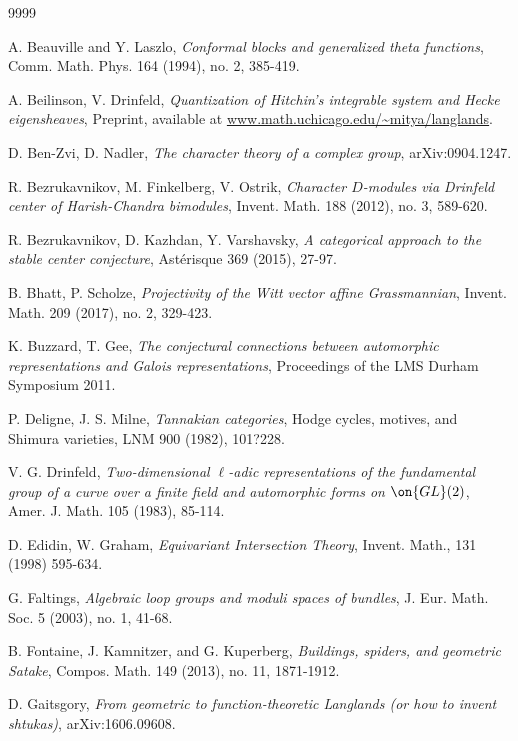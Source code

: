 \documentclass[11pt]{amsart}
\theoremstyle{definition}
\theoremstyle{definition}
\theoremstyle{definition}
\numberwithin{equation}{subsection}
\newcommand{\GL}{{\on{GL}}}
\begin{document}
\begin{thebibliography}{9999}


A. Beauville and Y. Laszlo, {\it Conformal blocks and generalized theta functions}, Comm. Math. Phys. 164 (1994), no. 2, 385-419. 

A. Beilinson, V. Drinfeld, {\it Quantization of Hitchin's integrable system and Hecke
eigensheaves}, Preprint, available at \url{www.math.uchicago.edu/~mitya/langlands}.

D. Ben-Zvi, D. Nadler, {\it The character theory of a complex group}, arXiv:0904.1247.

R. Bezrukavnikov, M. Finkelberg, V. Ostrik, {\it Character $D$-modules via Drinfeld center of Harish-Chandra bimodules}, Invent. Math. 188 (2012), no. 3, 589-620. 

R. Bezrukavnikov, D. Kazhdan, Y. Varshavsky, {\it A categorical approach to the stable center conjecture}, Ast\'erisque 369 (2015), 27-97.

B. Bhatt, P. Scholze, {\it Projectivity of the Witt vector affine Grassmannian}, Invent. Math. 209 (2017), no. 2, 329-423.

K. Buzzard, T. Gee, {\it The conjectural connections between automorphic representations and Galois representations}, Proceedings of the LMS Durham Symposium 2011.

P. Deligne, J. S. Milne, {\it Tannakian categories}, Hodge cycles, motives, and Shimura varieties, LNM 900 (1982), 101?228.

V. G. Drinfeld, {\it Two-dimensional $\ell$-adic representations of the fundamental group of a
curve over a finite field and automorphic forms on $\GL(2)$}, Amer. J. Math. 105 (1983), 85-114.

D. Edidin, W. Graham, {\it Equivariant Intersection Theory}, Invent. Math., 131 (1998) 595-634.

G. Faltings, {\it Algebraic loop groups and moduli spaces of bundles}, J. Eur. Math. Soc. 5 (2003), no. 1, 41-68.

B. Fontaine, J. Kamnitzer, and G. Kuperberg, {\it Buildings, spiders, and geometric Satake}, Compos. Math. 149 (2013), no. 11, 1871-1912. 

D. Gaitsgory, {\it From geometric to function-theoretic Langlands (or how to invent shtukas)}, arXiv:1606.09608.


\end{thebibliography}
\end{document}
